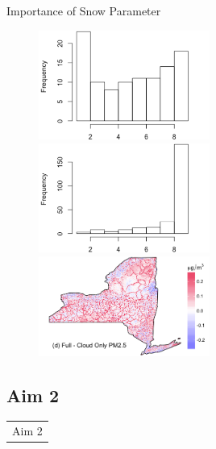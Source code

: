 \documentclass[handout]{beamer} %
\begin{document}
\begin{frame}{Importance of Snow Parameter}
    \begin{figure}
        \centering
        \includegraphics[width=0.5\textwidth]{img/appendix/Aim1/snow_before.png}
        \includegraphics[width=0.5\textwidth]{img/appendix/Aim1/snow_after.png}\\
        \includegraphics[width=0.5\textwidth]{img/appendix/Aim1/figure44.png}
    \end{figure}
\end{frame}


\subsection*{Aim 2}

\begin{frame}{}
    \begin{table}
        \LARGE
        \centering
        \begin{tabular}{c}
             \textcolor[rgb]{0.1,0.1,0.6}{Aim 2}
        \end{tabular}
    \end{table}
\end{frame}
\end{document}
